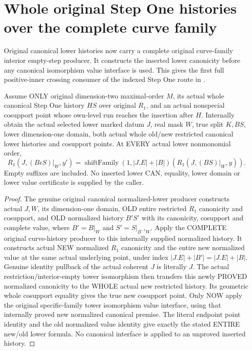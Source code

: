 \section{Whole original Step One histories over the complete curve family}

Original canonical lower histories now carry a complete original curve-family
interior empty-step producer. It constructs the inserted lower canonicity
before any canonical isomorphism value interface is used. This gives the
first full positive-inner crossing consumer of the indexed Step One route in
\cite{wlodarczyk05-hironaka,bierstone-milman08-functoriality}.

\begin{theorem}
\label{hir:original-crossing-entire-curve-lower-history}
\leanok
Assume ONLY original dimension-two maximal-order $M$, its actual whole
canonical Step One history $HS$ over original $R_1$, and an actual nonspecial
cosupport point whose own-level run reaches the insertion after $H$.
Internally obtain the actual selected lower marked datum $J$, real mask $W$,
true split $K,BS$, lower dimension-one domain, both actual whole old/new
restricted canonical lower histories and cosupport points. At EVERY actual
lower nonmonomial order,
\[
 R_1(J,(B\epsilon S)|_W,y')=
 \operatorname{shiftFamily}(1,|J.E|+|B|)(R_1(J,(BS)|_W,y)).
\]
Empty suffixes are included. No inserted lower CAN, equality, lower domain or
lower value certificate is supplied by the caller.
\end{theorem}
\begin{proof}
The genuine original canonical normalized-lower producer constructs actual
$J,W$, its dimension-one domain, OLD entire restricted $R_1$ canonicity and
cosupport, and OLD normalized history $B' S'$ with its canonicity, cosupport
and complete value, where $B'=B|_W$ and $S'=S|_{B^{-1}W}$.
Apply the COMPLETE original curve-history producer to this internally supplied
normalized history. It constructs actual NEW normalized $R_1$ canonicity and
the entire new normalized value at the same actual underlying point, under
index $|J.E|+|B'|=|J.E|+|B|$. Genuine identity pullback of the actual coherent
$J$ is literally $J$. The actual restriction/interior-empty tower isomorphism
then transfers this newly PROVED normalized canonicity to the WHOLE actual
new restricted history. Its geometric whole cosupport equality gives the
true new cosupport point. Only NOW apply the original specific-family tower
isomorphism value interface, using that internally proved new normalized
canonical premise. The literal endpoint point identity and the old normalized
value identity give exactly the stated ENTIRE new/old lower formula. No
canonical interface is applied to an unproved inserted history.
\end{proof}

